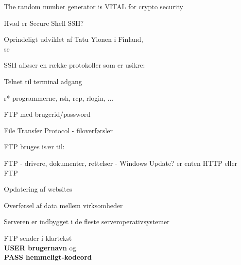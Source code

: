 \documentclass[20pt,landscape,a4paper,footrule]{foils}
\begin{document}


{\small{}}

\vskip 2cm
\centerline{The random number generator is VITAL for crypto security}




\begin{list1}
\item Hvad er Secure Shell SSH?  
\item Oprindeligt udviklet af Tatu Ylonen i Finland,\\
se 
\item SSH afløser en række protokoller som er usikre:
  \begin{list2}
  \item Telnet til terminal adgang
  \item r* programmerne, rsh, rcp, rlogin, ...
  \item FTP med brugerid/password
  \end{list2}
\end{list1}



\begin{list1}
\item File Transfer Protocol - filoverførsler
\item FTP bruges især til:
  \begin{list2}
    \item FTP - drivere, dokumenter, rettelser - Windows Update? er
    enten HTTP eller FTP
\item Opdatering af websites
\item Overførsel af data mellem virksomheder
\item Serveren er indbygget i de fleste serveroperativsystemer
  \end{list2}
\item FTP sender i klartekst\\ 
{\bfseries USER brugernavn} og \\
{\bfseries PASS hemmeligt-kodeord} 
\end{list1}
\end{document}
